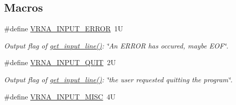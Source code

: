 \subsection*{Macros}
\begin{DoxyCompactItemize}
\item 
\hypertarget{group__utils_gad403c9ea58f1836689404c2931419c8c}{}\#define \hyperlink{group__utils_gad403c9ea58f1836689404c2931419c8c}{V\+R\+N\+A\+\_\+\+I\+N\+P\+U\+T\+\_\+\+E\+R\+R\+O\+R}~1\+U\label{group__utils_gad403c9ea58f1836689404c2931419c8c}

\begin{DoxyCompactList}\small\item\em Output flag of \hyperlink{group__utils_ga8ef1835eb83f542396f59f0b205965e5}{get\+\_\+input\+\_\+line()}\+: {\itshape \char`\"{}\+An E\+R\+R\+O\+R has occured, maybe E\+O\+F\char`\"{}}. \end{DoxyCompactList}\item 
\hypertarget{group__utils_ga72f3c6ca5c83d2b9baed2922d19c403d}{}\#define \hyperlink{group__utils_ga72f3c6ca5c83d2b9baed2922d19c403d}{V\+R\+N\+A\+\_\+\+I\+N\+P\+U\+T\+\_\+\+Q\+U\+I\+T}~2\+U\label{group__utils_ga72f3c6ca5c83d2b9baed2922d19c403d}

\begin{DoxyCompactList}\small\item\em Output flag of \hyperlink{group__utils_ga8ef1835eb83f542396f59f0b205965e5}{get\+\_\+input\+\_\+line()}\+: {\itshape \char`\"{}the user requested quitting the program\char`\"{}}. \end{DoxyCompactList}\item 
\hypertarget{group__utils_ga8e3241b321c9c1a78a69e59e2e019a71}{}\#define \hyperlink{group__utils_ga8e3241b321c9c1a78a69e59e2e019a71}{V\+R\+N\+A\+\_\+\+I\+N\+P\+U\+T\+\_\+\+M\+I\+S\+C}~4\+U\label{group__utils_ga8e3241b321c9c1a78a69e59e2e019a71}


\end{DoxyCompactItemize}
